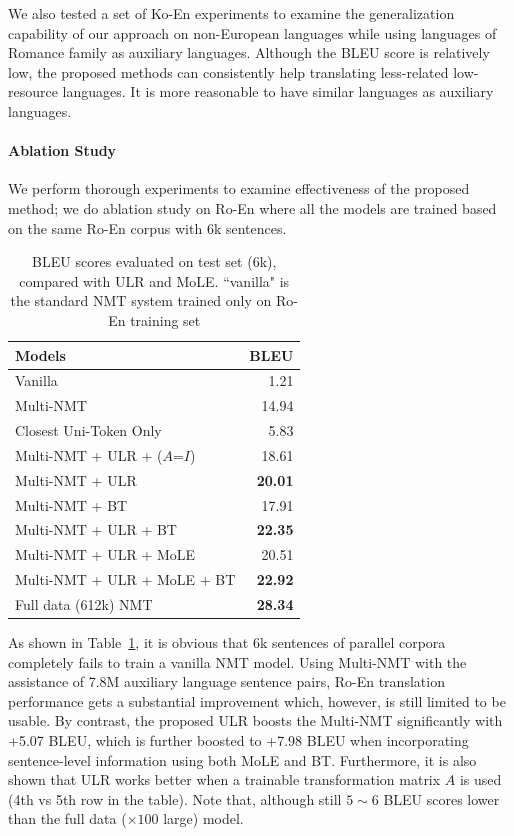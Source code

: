 We also tested a set of Ko-En experiments to examine the generalization capability of our approach on  non-European languages while using languages of Romance family as auxiliary languages. Although the BLEU score is relatively low, the proposed methods can consistently help  translating less-related low-resource languages. It is more reasonable to have  similar languages as auxiliary languages.



\paragraph{Ablation Study}
We perform  thorough experiments to examine effectiveness of the proposed method; we do ablation study on Ro-En where  all the models are trained based on the same Ro-En corpus with 6k sentences.  
\begin{table}[hptb]
 	\centering
    \begin{tabular}{l|r}
    Models                   & BLEU  \\ \hline
    Vanilla                        & 1.21   \\
    Multi-NMT                 & 14.94 \\ \hline
    Closest Uni-Token Only        & 5.83  \\
    Multi-NMT + ULR + ($A$=$I$) & 18.61 \\ 
    Multi-NMT + ULR       & \textbf{20.01} \\ \hline
    Multi-NMT + BT & 17.91 \\
    Multi-NMT + ULR + BT & \textbf{22.35} \\  \hline
    Multi-NMT + ULR + MoLE & 20.51 \\
    Multi-NMT + ULR + MoLE + BT & \textbf{22.92} \\ \hline\hline
    Full data (612k) NMT & \textbf{28.34} \\
    \end{tabular}
    \caption{\label{cp5.table.ro_test1} BLEU scores evaluated on test set (6k), compared with ULR and MoLE. ``vanilla" is the standard NMT system trained only on Ro-En training set}
\end{table}

As shown in Table~\ref{cp5.table.ro_test1}, it is obvious that 6k sentences of parallel corpora  completely fails to train a vanilla  NMT model. Using Multi-NMT with the assistance of 7.8M auxiliary language sentence pairs, Ro-En translation performance gets a substantial improvement which, however, is still limited to be usable. By contrast, the proposed ULR boosts the Multi-NMT significantly with +5.07 BLEU, which is further boosted to +7.98 BLEU when incorporating sentence-level information using both MoLE and BT.  Furthermore, it is also shown that ULR works better when a trainable transformation matrix $A$ is used (4th vs 5th row in the table). Note that, although still $5\sim 6$ BLEU scores lower than the full data ($\times 100$ large) model. 

